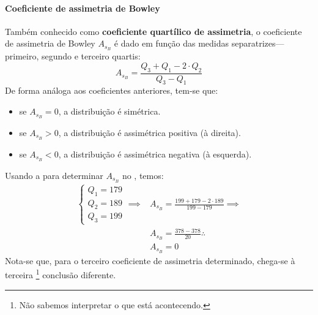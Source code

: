 \paragraph{Coeficiente de assimetria de Bowley}
Também conhecido como \textbf{coeficiente quartílico de assimetria}, o
coeficiente de assimetria de Bowley $A_{s_B}$ é dado em função das medidas
separatrizes---primeiro, segundo e terceiro quartis:
\begin{equation}
    A_{s_B} = \frac{Q_3+Q_1-2 \cdot Q_2}{Q_3-Q_1}
    \label{eq:coef-ass-bowley}
\end{equation}
De forma análoga aos coeficientes anteriores, tem-se que:
\begin{itemize}
    \item se $A_{s_B}=0$, a distribuição é simétrica.
    \item se $A_{s_B}>0$, a distribuição é assimétrica positiva (à direita).
    \item se $A_{s_B}<0$, a distribuição é assimétrica negativa (à esquerda).
\end{itemize}
Usando a  para determinar $A_{s_B}$ no
, temos:
\begin{align*}
    \begin{cases}
        Q_1 = 179 \\
        Q_2 = 189 \\
        Q_3 = 199
    \end{cases} \implies
    &A_{s_B} = \frac{199+179-2 \cdot 189}{199-179} \implies \\
    &A_{s_B} = \frac{378-378}{20} \therefore \\
    &A_{s_B} = 0
\end{align*}
Nota-se que, para o terceiro coeficiente de assimetria determinado, chega-se à
terceira \footnote{Não sabemos interpretar o que está acontecendo.}
conclusão diferente.

